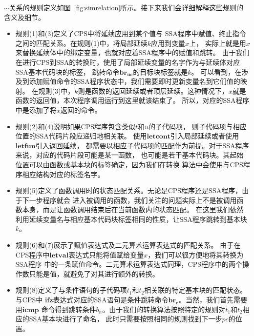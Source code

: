 $\sim$关系的规则定义如图~\ref{fig:simrelation}所示。接下来我们会详细解释这些规则的含义及细节。
\begin{itemize}
  \item 规则(1)和(3)定义了CPS中将延续应用到某个值与
  SSA程序中赋值、终止指令之间的匹配关系。在规则(1)中，将局部延续$k$应用到变量$x$上，
  实际上就是用$x$来替换延续体中的绑定变量，也就对应着SSA程序中的赋值和跳转。
  由于我们在进行CPS到SSA的转换时，使用了局部延续变量的名字作为与延续体对应SSA基本代码块的标签，
  跳转命令$\mathbf{br_{uc}}$的目标块标签就是$k$。
  可以看到，在涉及到添加赋值命令的SSA程序状态中，我们需要即时更新变量名到它们值的映射。
  在规则(3)中，$k$则是函数的返回延续或者顶层延续。这种情况下，$x$就是函数的返回值，本次程序调用运行到这里就该结束了。
  所以，对应的SSA程序中是添加了将$x$返回的命令。
  \item 规则(2)和(4)说明如果CPS程序包含类似$t$和$u$的子代码项，
  则子代码项与相应位置的SSA代码片段应递归地相关联。
  使用$\mathbf{letcont}$引入局部延续或者使用$\mathbf{letfun}$引入返回延续，
  都需要以相应子代码项的匹配作为前提。对于SSA程序来说，对应的代码片段可能是某一函数，
  也可能是若干基本代码块。其起始位置可以由函数或基本块的标签确定，因为我们在转换
  算法中会使用与CPS程序相应结构对应的标签名字。
  \item 规则(5)定义了函数调用时的状态匹配关系。无论是CPS程序还是SSA程序，由于下一步程序就会
  进入被调用的函数，我们关注的问题实际上不是被调用函数本身，而是让函数调用结束后在当前函数内的状态匹配。
  在这里我们依然利用延续变量名与相应基本代码块标签相同的性质，让SSA程序跳转到基本块$k$。
  \item 规则(6)和(7)展示了赋值表达式及二元算术运算表达式的匹配关系。
  由于在CPS程序中$\mathbf{letval}$表达式只能将值赋给变量$x$，我们可以很方便地将其转换为SSA程序
  中的一条赋值命令。二元算术运算表达式同理，CPS程序中的两个操作数只能是值，就避免了对其进行额外的转换。
  \item 规则(8)定义了与条件语句的子代码项$t_1$和$t_2$相关联的特定基本块的匹配状态。与CPS中
  $\mathbf{ifz}$表达式对应的SSA语句是条件跳转命令$\mathbf{br_c}$。当然，我们首先需要用$\mathbf{icmp}$
  命令得到跳转条件$b_n$。由于我们的转换算法按照特定的规则对$t_1$和$t_2$相应的SSA基本块进行了命名，
  此时只需要按照相同的规则找到下一步$pc$的位置。
\end{itemize}

